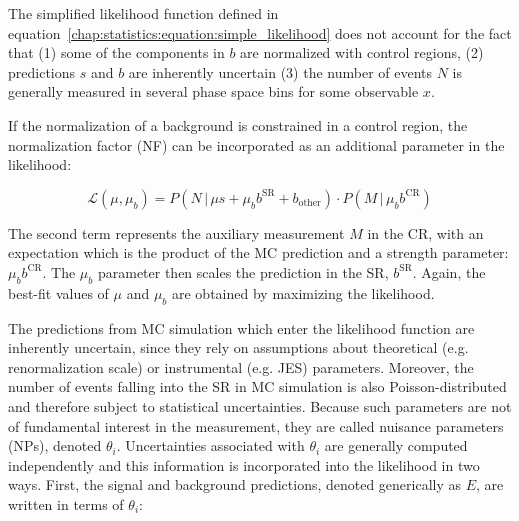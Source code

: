 
The simplified likelihood function defined in
equation~\ref{chap:statistics:equation:simple_likelihood} does not
account for the fact that (1) some of the components in $b$ are
normalized with control regions, (2) predictions $s$ and $b$ are inherently
uncertain (3) the number of events $N$ is generally measured in
several phase space bins for some observable $x$. 

If the normalization of a background is constrained in a control
region, the normalization factor (NF) can be incorporated as an
additional parameter in the likelihood:

\begin{equation}
\mathscr{L}(\mu,\mu_b) = P(N\,|\,\mu s + \mu_b b^{\textrm{SR}} +
b_{\textrm{other}}) \cdot P(M\,|\,\mu_b b^{\textrm{CR}})
\label{chap:statistics:equation:likelihood_CR}
\end{equation}

\noindent
The second term represents the auxiliary measurement $M$ in the CR,
with an expectation
which is the product of the MC prediction and a strength parameter:
 $\mu_b b^{\textrm{CR}}$.
The $\mu_b$ parameter then
scales the prediction in the SR, $b^{\textrm{SR}}$. Again, the
best-fit values of $\mu$ and $\mu_b$ are obtained by maximizing the
likelihood. 

The predictions from MC simulation which enter the likelihood function
are inherently uncertain, since they rely on assumptions about
theoretical (e.g. renormalization scale) or instrumental (e.g. JES)
parameters. Moreover, the number of events falling into the SR in MC
simulation is also Poisson-distributed
and therefore subject to statistical uncertainties. Because such
parameters are not of fundamental interest in the measurement, they
are called nuisance parameters (NPs), denoted
$\theta_i$. Uncertainties associated with $\theta_i$ are generally computed
independently and this information is incorporated into the likelihood
in two ways. First, the signal and background predictions, denoted
generically as $E$, are written in terms of $\theta_i$:

